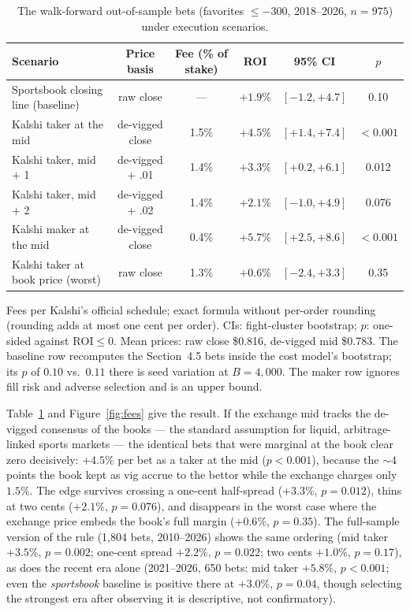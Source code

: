 \documentclass[11pt]{article}
\newcommand{\devig}{de-vigged}
\begin{document}
\begin{table}[t]
\centering
\begin{threeparttable}
\caption{The walk-forward out-of-sample bets (favorites $\le -300$, 2018--2026, $n=975$) under
execution scenarios.}
\label{tab:fees}
\begin{tabular}{lccccc}
\toprule
Scenario & Price basis & Fee (\% of stake) & ROI & 95\% CI & $p$ \\
\midrule
Sportsbook closing line (baseline) & raw close        & ---    & $+1.9\%$ & $[-1.2, +4.7]$ & 0.10 \\
Kalshi taker at the mid            & \devig{} close   & 1.5\%  & $+4.5\%$ & $[+1.4, +7.4]$ & $<0.001$ \\
Kalshi taker, mid $+$ 1\textcent{} & \devig{} $+$ .01 & 1.4\%  & $+3.3\%$ & $[+0.2, +6.1]$ & 0.012 \\
Kalshi taker, mid $+$ 2\textcent{} & \devig{} $+$ .02 & 1.4\%  & $+2.1\%$ & $[-1.0, +4.9]$ & 0.076 \\
Kalshi maker at the mid            & \devig{} close   & 0.4\%  & $+5.7\%$ & $[+2.5, +8.6]$ & $<0.001$ \\
Kalshi taker at book price (worst) & raw close        & 1.3\%  & $+0.6\%$ & $[-2.4, +3.3]$ & 0.35 \\
\bottomrule
\end{tabular}
\begin{tablenotes}\footnotesize
\item Fees per Kalshi's official schedule; exact formula without per-order rounding (rounding
adds at most one cent per order). CIs: fight-cluster bootstrap; $p$: one-sided against
$\mathrm{ROI}\le 0$. Mean prices: raw close \$0.816, \devig{} mid \$0.783. The baseline row
recomputes the Section~4.5 bets inside the cost model's bootstrap; its $p$ of $0.10$ vs.\ $0.11$
there is seed variation at $B=4{,}000$. The maker row ignores fill risk and adverse selection
and is an upper bound.
\end{tablenotes}
\end{threeparttable}
\end{table}

Table~\ref{tab:fees} and Figure~\ref{fig:fees} give the result. If the exchange mid tracks the
\devig{} consensus of the books --- the standard assumption for liquid, arbitrage-linked sports
markets --- the identical bets that were marginal at the book clear zero decisively: $+4.5\%$ per
bet as a taker at the mid ($p < 0.001$), because the ${\sim}4$ points the book kept as vig accrue
to the bettor while the exchange charges only $1.5\%$. The edge survives crossing a one-cent
half-spread ($+3.3\%$, $p = 0.012$), thins at two cents ($+2.1\%$, $p = 0.076$), and disappears
in the worst case where the exchange price embeds the book's full margin ($+0.6\%$, $p = 0.35$).
The full-sample version of the rule (1{,}804 bets, 2010--2026) shows the same ordering (mid
taker $+3.5\%$, $p = 0.002$; one-cent spread $+2.2\%$, $p = 0.022$; two cents $+1.0\%$,
$p = 0.17$), as does the recent era alone (2021--2026, 650 bets: mid taker $+5.8\%$,
$p < 0.001$; even the \emph{sportsbook} baseline is positive there at $+3.0\%$, $p = 0.04$,
though selecting the strongest era after observing it is descriptive, not confirmatory).
\end{document}
